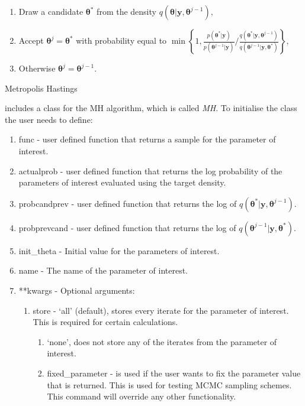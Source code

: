 \documentclass[article]{jss}
\begin{document}
%
\begin{algorithm}[H]
\begin{enumerate}
\item Draw a candidate $\bm{\bm{\theta}}^{\ast}$ from the density $q\left(\bm{\bm{\theta}}|\bm{y},\bm{\theta}^{j-1}\right),$ 
\item Accept $\bm{\theta}^{j}=\bm{\theta}^{\ast}$ with probability equal
to $\min\left\{ 1,\frac{p\left(\bm{\theta}^{\ast}|\bm{y}\right)}{p\left(\bm{\theta}^{j-1}|\bm{y}\right)}/\frac{q\left(\bm{\theta}^{\ast}|\bm{y},\bm{\theta}^{j-1}\right)}{q\left(\bm{\theta}^{j-1}|\bm{y},\bm{\theta}^{*}\right)}\right\} ,$ 
\item Otherwise $\bm{\theta}^{j}=\bm{\theta}^{j-1}.$ 
\end{enumerate}
\caption{Metropolis Hastings}
\label{alg:MH}
\end{algorithm}


 includes a class for the MH algorithm, which is called
\emph{MH}.  To initialise the class the user needs to define:
\begin{enumerate}
\item func - user defined function that returns a sample for the
  parameter of interest.
\item actualprob - user defined function that returns the log
  probability of the parameters of interest evaluated using the target
  density.
\item probcandprev - user defined function that returns the log of
  $q\left(\bm{\theta}^{\ast}|\bm{y},\bm{\theta}^{j-1}\right).$
\item probprevcand - user defined function that returns the log of
  $q\left(\bm{\theta}^{j-1}|\bm{y},\bm{\theta}^{*}\right).$
\item init\_theta - Initial value for the parameters of interest.
\item name - The name of the parameter of interest.
\item {*}{*}kwargs - Optional arguments:

\begin{enumerate}
\item store - `all' (default), stores every iterate for the parameter
  of interest. This is required for certain calculations.

\begin{enumerate}
\item `none', does not store any of the iterates from the parameter of
  interest.
\item fixed\_parameter - is used if the user wants to fix the
  parameter value that is returned. This is used for testing MCMC
  sampling schemes.  This command will override any other
  functionality.
\end{enumerate}
\end{enumerate}
\end{enumerate}
\end{document}
